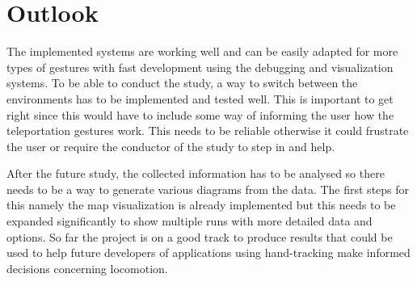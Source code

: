 \chapter{Outlook}

The implemented systems are working well and can be easily adapted for more types of gestures with fast development using the debugging and visualization systems. To be able to conduct the study, a way to switch between the environments has to be implemented and tested well. This is important to get right since this would have to include some way of informing the user how the teleportation gestures work. This needs to be reliable otherwise it could frustrate the user or require the conductor of the study to step in and help.  

After the future study, the collected information has to be analysed so there needs to be a way to generate various diagrams from the data. The first steps for this namely the map visualization is already implemented but this needs to be expanded significantly to show multiple runs with more detailed data and options. So far the project is on a good track to produce results that could be used to help future developers of applications using hand-tracking make informed decisions concerning locomotion.